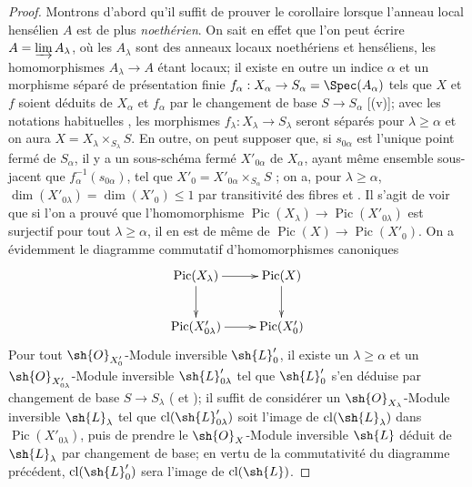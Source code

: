 \begin{proof}
Montrons d'abord qu'il suffit de prouver le corollaire lorsque l'anneau local hensélien $A$ est de plus \emph{noethérien}.
On sait en effet  que l'on peut écrire $A=\varinjlim A_\lambda$, où les $A_\lambda$ sont des anneaux locaux noethériens et henséliens, les homomorphismes $A_\lambda\to A$ étant locaux;
il existe en outre un indice $\alpha$ et un morphisme séparé de présentation finie $f_\alpha:X_\alpha\to S_\alpha=\Spec(A_\alpha)$ tels que $X$ et $f$ soient déduits de $X_\alpha$ et $f_\alpha$ par le changement de base $S\to S_\alpha$ [(v)];
avec les notations habituelles , les morphismes $f_\lambda:X_\lambda\to S_\lambda$ seront séparés pour $\lambda\geq\alpha$ et on aura $X=X_\lambda\times_{S_\lambda}S$.
En outre, on peut supposer que, si $s_{0\alpha}$ est l'unique point fermé de $S_\alpha$, il y a un sous-schéma fermé $X'_{0\alpha}$ de $X_\alpha$, ayant même ensemble sous-jacent que $f_\alpha^{-1}(s_{0\alpha})$, tel que $X'_0=X'_{0\alpha}\times_{S_\alpha}S$ ;
on a, pour $\lambda\geq\alpha$, $\dim(X'_{0\lambda})=\dim(X'_0)\leq1$ par transitivité des fibres et .
Il s'agit de voir que si l'on a prouvé que l'homomorphisme $\operatorname{Pic}(X_\lambda)\to\operatorname{Pic}(X'_{0\lambda})$ est surjectif pour tout $\lambda\geq\alpha$, il en est de même de $\operatorname{Pic}(X)\to\operatorname{Pic}(X'_0)$.
On a évidemment le diagramme commutatif d'homomorphismes canoniques
\[
  \xymatrix{
    \operatorname{Pic}(X_\lambda) \ar[r] \ar[d] & \operatorname{Pic}(X) \ar[d]\\
    \operatorname{Pic}(X'_{0\lambda}) \ar[r] & \operatorname{Pic}(X'_0)
  }
\]
Pour tout $\sh{O}_{X'_0}$-Module inversible $\sh{L}'_0$, il existe un $\lambda\geq\alpha$ et un $\sh{O}_{X'_{0\lambda}}$-Module inversible $\sh{L}'_{0\lambda}$ tel que $\sh{L}'_0$ s'en déduise par changement de base $S\to S_\lambda$ ( et );
il suffit de
considérer un $\sh{O}_{X_\lambda}$-Module inversible $\sh{L}_\lambda$ tel que $\operatorname{cl}(\sh{L}'_{0\lambda})$ soit l'image de $\operatorname{cl}(\sh{L}_\lambda)$ dans $\operatorname{Pic}(X'_{0\lambda})$, puis de prendre le $\sh{O}_X$-Module inversible $\sh{L}$ déduit de $\sh{L}_\lambda$ par changement de base;
en vertu de la commutativité du diagramme précédent, $\operatorname{cl}(\sh{L}'_0)$ sera l'image de $\operatorname{cl}(\sh{L})$.


\end{proof}

